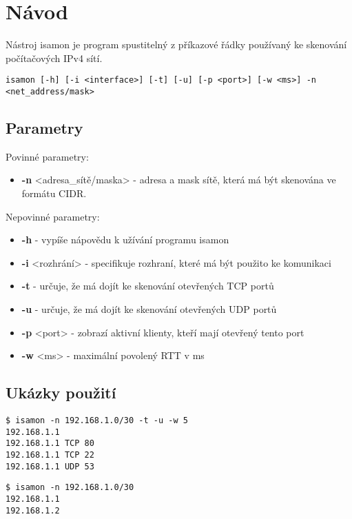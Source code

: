 \documentclass[../projekt.tex]{subfiles}
\begin{document}
\chapter{Návod}

Nástroj isamon je program spustitelný z příkazové řádky používaný ke skenování počítačových IPv4 sítí.


\begin{lstlisting}[caption=Možnosti použití nástroje isamon.]
isamon [-h] [-i <interface>] [-t] [-u] [-p <port>] [-w <ms>] -n <net_address/mask>
\end{lstlisting}

\section{Parametry}

Povinné parametry:
\begin{itemize}
    \item \textbf{-n} <adresa\_sítě/maska> - adresa a mask sítě, která má být skenována ve formátu CIDR\cite{RFC4632}.  
\end{itemize}

Nepovinné parametry:
\begin{itemize}
    \item \textbf{-h} - vypíše nápovědu k užívání programu isamon
    \item \textbf{-i} <rozhrání> - specifikuje rozhraní, které má být použito ke komunikaci
    \item \textbf{-t} - určuje, že má dojít ke skenování otevřených TCP portů
    \item \textbf{-u} - určuje, že má dojít ke skenování otevřených UDP portů
    \item \textbf{-p} <port> - zobrazí aktivní klienty, kteří mají otevřený tento port
    \item \textbf{-w} <ms> - maximální povolený RTT v ms
\end{itemize}


\section{Ukázky použití}

\begin{lstlisting}[caption=Ukázka použití isamon pro skenování TCP a UDP portů sítě 192.168.1.0/30 s maximálním RTT 5 ms.]
$ isamon -n 192.168.1.0/30 -t -u -w 5 
192.168.1.1
192.168.1.1 TCP 80
192.168.1.1 TCP 22
192.168.1.1 UDP 53
\end{lstlisting}

\begin{lstlisting}[caption=Ukázka použití isamon pro skenování aktivních hostů na síti 192.168.1.0/30.]
$ isamon -n 192.168.1.0/30
192.168.1.1
192.168.1.2
\end{lstlisting}
\end{document}
